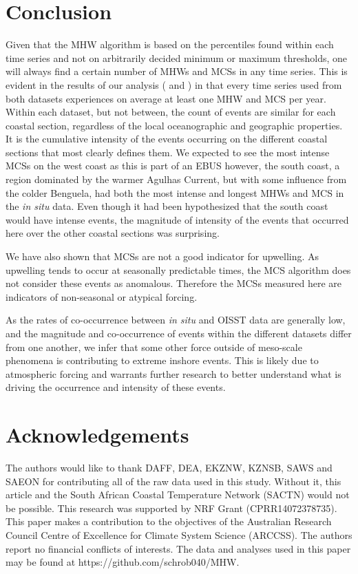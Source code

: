 \documentclass[a4paper,10pt,review]{elsarticle}
\begin{document}
\section{Conclusion}
Given that the MHW algorithm is based on the percentiles found within each time series and not on arbitrarily decided minimum or maximum thresholds, one will always find a certain number of MHWs and MCSs in any time series. This is evident in the results of our analysis ( and ) in that every time series used from both datasets experiences on average at least one MHW and MCS per year. Within each dataset, but not between, the count of events are similar for each coastal section, regardless of the local oceanographic and geographic properties. It is the cumulative intensity of the events occurring on the different coastal sections that most clearly defines them. We expected to see the most intense MCSs on the west coast as this is part of an EBUS however, the south coast, a region dominated by the warmer Agulhas Current, but with some influence from the colder Benguela, had both the most intense and longest MHWs and MCS in the \emph{in situ} data. Even though it had been hypothesized that the south coast would have intense events, the magnitude of intensity of the events that occurred here over the other coastal sections was surprising.

We have also shown that MCSs are not a good indicator for upwelling. As upwelling tends to occur at seasonally predictable times, the MCS algorithm does not consider these events as anomalous. Therefore the MCSs measured here are indicators of non-seasonal or atypical forcing.

As the rates of co-occurrence between \emph{in situ} and OISST data are generally low, and the magnitude and co-occurrence of events within the different datasets differ from one another, we infer that some other force outside of meso-scale phenomena is contributing to extreme inshore events. This is likely due to atmospheric forcing and warrants further research to better understand what is driving the occurrence and intensity of these events.

\section*{Acknowledgements}
The authors would like to thank DAFF, DEA, EKZNW, KZNSB, SAWS and SAEON for contributing all of the raw data used in this study. Without it, this article and the South African Coastal Temperature Network (SACTN) would not be possible. This research was supported by NRF Grant (CPRR14072378735). This paper makes a contribution to the objectives of the Australian Research Council Centre of Excellence for Climate System Science (ARCCSS). The authors report no financial conflicts of interests. The data and analyses used in this paper may be found at https://github.com/schrob040/MHW.
\end{document}
